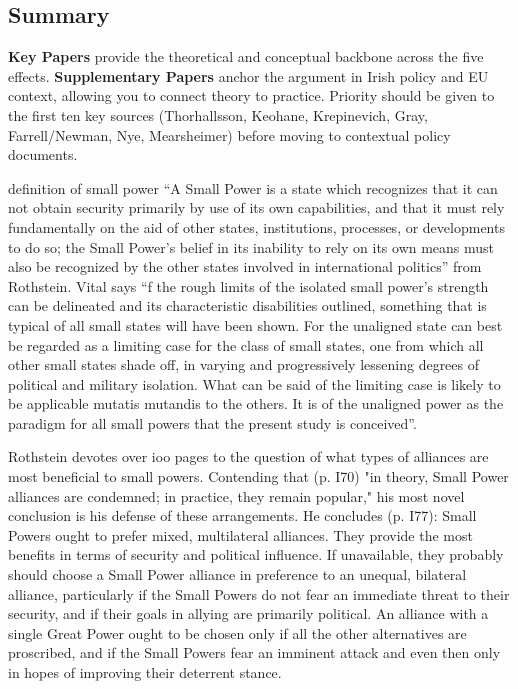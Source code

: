 \subsection*{Summary}
\textbf{Key Papers} provide the theoretical and conceptual backbone across the five effects. \textbf{Supplementary Papers} anchor the argument in Irish policy and EU context, allowing you to connect theory to practice. Priority should be given to the first ten key sources (Thorhallsson, Keohane, Krepinevich, Gray, Farrell/Newman, Nye, Mearsheimer) before moving to contextual policy documents.

definition of small power ``A Small Power is a state which recognizes that it can not obtain security
primarily by use of its own capabilities, and that it must rely fundamentally
on the aid of other states, institutions, processes, or developments to do so;
the Small Power's belief in its inability to rely on its own means must also be
recognized by the other states involved in international politics'' from Rothstein. Vital says ``f the rough limits of the isolated small power's strength can be delineated and its characteristic disabilities outlined, something that is
typical of all small states will have been shown. For the unaligned state can best be regarded as a limiting case for the class of small states, one from which all other small states shade off, in varying and progressively lessening degrees
of political and military isolation. What can be said of the limiting case is likely to be applicable mutatis mutandis to the others. It is of the unaligned power as the paradigm for all small powers that the present study is conceived''.

Rothstein devotes over ioo pages to the question of what types of alliances
are most beneficial to small powers. Contending that (p. I70) "in theory,
Small Power alliances are condemned; in practice, they remain popular," his
most novel conclusion is his defense of these arrangements. He concludes
(p. I77):
Small Powers ought to prefer mixed, multilateral alliances. They provide
the most benefits in terms of security and political influence. If unavailable,
they probably should choose a Small Power alliance in preference to an unequal, bilateral alliance, particularly if the Small Powers do not fear an immediate threat to their security, and if their goals in allying are primarily political.
An alliance with a single Great Power ought to be chosen only if all the other
alternatives are proscribed, and if the Small Powers fear an imminent attack and even then only in hopes of improving their deterrent stance.

